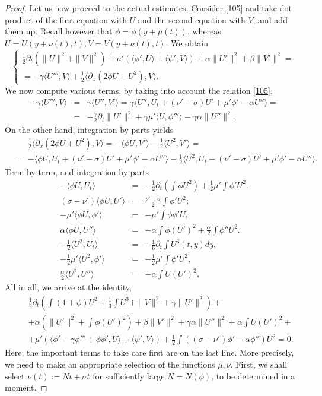 \documentclass[12pt]{amsart}
\theoremstyle{definition}
\theoremstyle{remark}
\numberwithin{equation}{section}
\renewcommand{\(}{\left(}
\renewcommand{\)}{\right)}
\renewcommand{\[}{\left[}
\renewcommand{\]}{\right]}
\newcommand{\f}[2]{\frac{#1}{#2}}
\newcommand{\al}{\alpha}
\newcommand{\be}{\beta}
\newcommand{\ga}{\gamma}
\newcommand{\si}{\sigma}
\newcommand{\dpr}[2]{\langle #1,#2 \rangle}
\newcommand{\p}{\partial}
\begin{document}
\begin{proof}
Let us now proceed to the actual estimates. Consider  \eqref{105} and  take dot product of the first equation with $U$ and the second equation with $V$, and add them up. Recall however that $\phi=\phi(y+\mu(t))$, whereas $U=U(y+\nu(t),t), V=V(y+\nu(t),t)$.
We obtain 
\begin{equation}
\label{110} 
\begin{cases}
	\f{1}{2} \p_t\left( \|U\|^2+\|V\|^2\right)+\mu'(\dpr{\phi'}{U}+\dpr{\psi'}{V})+ \al \|U'\|^2+\be\|V'\|^2= \\
	= -\ga\dpr{U'''}{V}+\f{1}{2} \dpr{\p_x (2\phi U+U^2)}{V}.
\end{cases}	
\end{equation}
We now compute various terms, by taking into account the relation \eqref{105}, 
\begin{eqnarray*}
	-\ga\dpr{U'''}{V} &=& \ga \dpr{U''}{V'}= \ga \dpr{U''}{U_t+(\nu'-\si)   U'+\mu'\phi'-\al U''}= \\
	&=& -\f{\ga}{2} \p_t \|U'\|^2+\ga\mu'\dpr{U}{\phi'''}-\ga \al \|U''\|^2. 
\end{eqnarray*}
On the other hand, integration by parts yields 
\begin{eqnarray*}
& & 	\f{1}{2}  \dpr{\p_x (2\phi U+U^2)}{V} = -\dpr{\phi U}{V'}-\f{1}{2}  \dpr{U^2}{V'}=  \\
	&=& - \dpr{\phi U}{U_t+(\nu'-\si) U'+\mu'\phi'-\al U''}- \f{1}{2}  \dpr{U^2}{U_t- (\nu'-\si)   U'+\mu'\phi'-\al U''}. 
\end{eqnarray*}
Term by term, and integration by parts 
\begin{eqnarray*}
	- \dpr{\phi U}{U_t} & = & -\f{1}{2} \p_t \left( \int \phi U^2 \right) +\f{1}{2}  \mu' \int \phi' U^2. \\
	(\si-\nu')  \dpr{\phi U}{U'} &=& \f{\nu'-\si}{2} \int \phi' U^2; \\
	- \mu' \dpr{\phi U}{\phi'}  &=&    -\mu' \int \phi\phi' U, \\
\al  \dpr{\phi U}{U''} &=& - \al \int \phi (U')^2 + \f{\al}{2}  \int \phi'' U^2. \\
-\f{1}{2} \dpr{U^2}{U_t} &=& -\f{1}{6} \p_t \int U^3(t,y) dy,\\
-\f{1}{2} \mu'\dpr{U^2}{\phi'} &=& -\f{1}{2} \mu'\int \phi' U^2,       \\ 
\f{\al}{2}   \dpr{U^2}{U''} &=& - \al \int  U (U')^2, 
\end{eqnarray*}
	All in all, we arrive at the identity, 
	\begin{eqnarray*}
	& &	\f{1}{2} \p_t\left( \int (1+ \phi) U^2+\f{1}{3} \int U^3+\|V\|^2+ \ga \|U'\|^2 \right)+\\
	& & + \al (\|U'\|^2+\int \phi (U')^2) + \be\|V'\|^2 + \ga \al \|U''\|^2+ \al \int  U (U')^2+ \\
& & + \mu'\left(\dpr{\phi'-\ga \phi'''+  \phi\phi'}{U} +\dpr{\psi'}{V}\right)+\f{1}{2}  \int  ((\si-\nu')  \phi' - \al \phi'')  U^2  =0.
	\end{eqnarray*}
 Here, the important terms to take care first are on the last line. More precisely, we need to make an appropriate selection of the functions $\mu, \nu$. First, we shall select $\nu(t):=N t+\si t$ for sufficiently large $N=N(\phi)$, to be determined in a moment. 
 

\end{proof}
\end{document}
